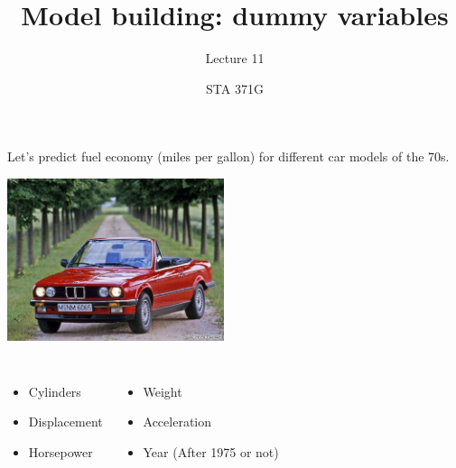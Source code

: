\documentclass{beamer}\usepackage[]{graphicx}\usepackage[]{color}
\title{Model building: dummy variables}
\subtitle{Lecture 11}
\author{STA 371G}
\begin{document}
  
  
  

  \frame{\maketitle}



  \begin{darkframes}
    \begin{frame}
      Let's predict fuel economy (miles per gallon) for different car models of the 70s.

      \begin{center}
        \includegraphics[width=2.5in]{bmw} \\
      \end{center} \pause

      \begin{columns}[onlytextwidth]
          \begin{itemize}
            \item Cylinders
            \item Displacement
            \item Horsepower
          \end{itemize}
          \begin{itemize}
            \item Weight
            \item Acceleration
            \item Year (After 1975 or not)
          \end{itemize}
      \end{columns}
    \end{frame}


\end{darkframes}
\end{document}
